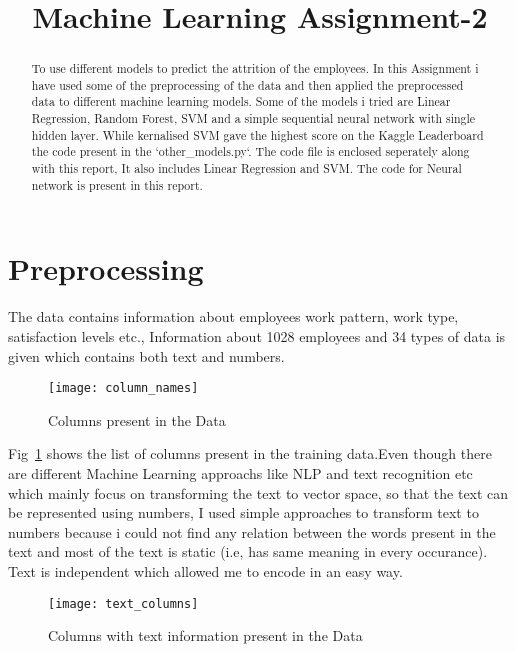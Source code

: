 \documentclass{article}
\title{Machine Learning Assignment-2}
\begin{document}
%
\maketitle
%
\begin{abstract}
  To use different models to predict the attrition of the employees. In this Assignment i have used some of the preprocessing of the data and then applied the preprocessed data to different machine learning models. Some of the models i tried are Linear Regression, Random Forest, SVM and a simple sequential neural network with single hidden layer. While kernalised SVM gave the highest score on the Kaggle Leaderboard the code present in the `other\_models.py`. The code file is enclosed seperately along with this report, It also includes Linear Regression and SVM. The code for Neural network is present in this report.
\end{abstract}

\section{Preprocessing}
\label{sec:intro}
The data contains information about employees work pattern, work type, satisfaction levels etc., Information about 1028 employees and 34 types of data is given which contains both text and numbers. 

\begin{figure}[h]\label{column_names}
  \texttt{[image: column\_names]}
  \caption{Columns present in the Data} 
\end{figure}

Fig~\ref{column_names} shows the list of columns present in the training data.Even though there are different Machine Learning approachs like NLP and text recognition etc which mainly focus on transforming the text to vector space, so that the text can be represented using numbers, I used simple approaches to transform text to numbers because i could not find any relation between the words present in the text and most of the text is static (i.e, has same meaning in every occurance). Text is independent which allowed me to encode in an easy way.  

\begin{figure}\label{text_col}
  \texttt{[image: text\_columns]}
  \caption{Columns with text information present in the Data}
\end{figure}
\end{document}
